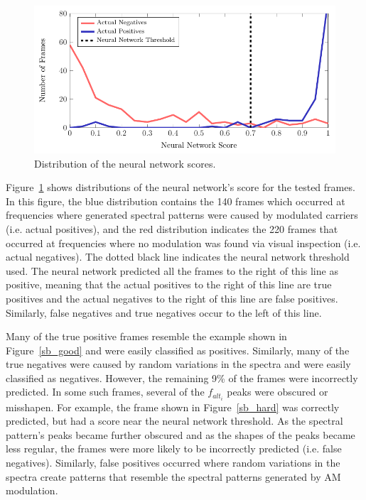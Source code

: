 \begin{figure}[htb]
\centering
\includegraphics[width=5in]{../eucap_fase/Drawing/nn_dist.pdf}
\caption{Distribution of the neural network scores.}
\label{nn_dist}
\end{figure}

Figure~\ref{nn_dist} shows distributions of the neural network's score for the tested frames. In this figure, the blue distribution contains the 140 frames which occurred at frequencies where generated spectral patterns were caused by modulated carriers (i.e. actual positives), and the red distribution indicates the 220 frames that occurred at frequencies where no modulation was found via visual inspection (i.e. actual negatives). The dotted black line indicates the neural network threshold used. The neural network predicted all the frames to the right of this line as positive, meaning that the actual positives to the right of this line are true positives and the actual negatives to the right of this line are false positives. Similarly, false negatives and true negatives occur to the left of this line. 

Many of the true positive frames resemble the example shown in Figure~\ref{sb_good} and were easily classified as positives. Similarly, many of the true negatives were caused by random variations in the spectra and were easily classified as negatives. However, the remaining 9\% of the frames were incorrectly predicted. In some such frames, several of the $f_{alt_i}$ peaks were obscured or misshapen. For example, the frame shown in Figure~\ref{sb_hard} was correctly predicted, but had a score near the neural network threshold. As the spectral pattern's peaks became further obscured and as the shapes of the peaks became less regular, the frames were more likely to be incorrectly predicted (i.e. false negatives). Similarly, false positives occurred where random variations in the spectra create patterns that resemble the spectral patterns generated by AM modulation.

